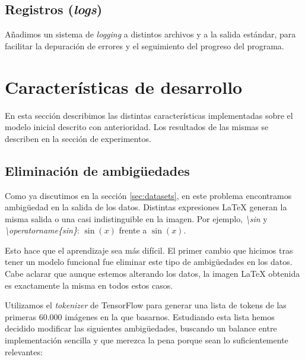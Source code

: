\documentclass[a4paper, 20pt, dvipsnames]{article}
\begin{document}
\subsection{Registros (\emph{logs})}

Añadimos un sistema de \emph{logging} a distintos archivos y a la salida
estándar, para facilitar la depuración de errores y el seguimiento del progreso
del programa.


\section{Características de desarrollo}


En esta sección describimos las distintas características implementadas sobre el
modelo inicial descrito con anterioridad. Los resultados de las mismas se
describen en la sección de experimentos.


\subsection{Eliminación de ambigüedades}
\label{feature:rem-amb}

Como ya discutimos en la sección \ref{sec:datasets}, en este problema
encontramos ambigüedad en la salida de los datos. Distintas expresiones \LaTeX{}
generan la misma salida o una casi indistinguible en la imagen. Por ejemplo,
\emph{\textbackslash sin} y \emph{\textbackslash operatorname\{sin\}}: $\sin(x)$
frente a $\operatorname{sin}(x)$.

Esto hace que el aprendizaje sea más difícil. El primer cambio que hicimos tras
tener un modelo funcional fue eliminar este tipo de ambigüedades en los
datos. Cabe aclarar que aunque estemos alterando los datos, la imagen \LaTeX{}
obtenida es exactamente la misma en todos estos casos.

Utilizamos el \emph{tokenizer} de TensorFlow \cite{tokenizer} para generar una
lista de tokens de las primeras 60.000 imágenes en la que basarnos. Estudiando
esta lista hemos decidido modificar las siguientes ambigüedades, buscando un
balance entre implementación sencilla y que merezca la pena porque sean lo
suficientemente relevantes:
\end{document}
